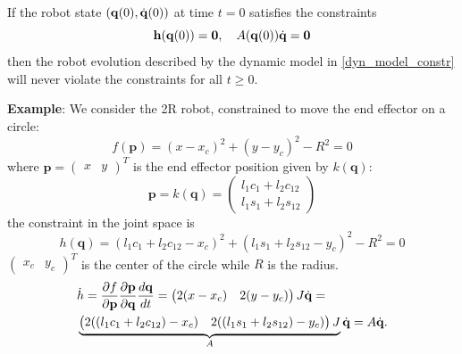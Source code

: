 \documentclass[10pt, a4paper]{report}
\newcommand{\q}{{\mathbf q}}
\begin{document}
\begin{boxproposition}{}{}
    If the robot state $(\q(0),\dq(0))$ at time $t=0$ satisfies the constraints\begin{equation}
        \mathbf h(\q(0))=\mathbf 0, \ \ \ A(\q(0))\dq=\mathbf 0 
    \end{equation}
    then the robot evolution described by the dynamic model in \eqref{dyn_model_constr} will never violate the constraints for all $t\ge 0$.
\end{boxproposition}
\noindent\textbf{Example}: We consider the 2R robot, constrained to move the end effector on a circle:\begin{equation}
    f(\mathbf p)=(x-x_c)^2+(y-y_c)^2-R^2=0 
\end{equation}
where $\mathbf p=\begin{pmatrix}
    x&y
\end{pmatrix}^T$ is the end effector position given by $k(\q)$:\begin{equation}
    \mathbf p = k(\q)=\begin{pmatrix}
        l_1c_1+l_2c_{12}\\ 
        l_1s_1+l_2s_{12}
    \end{pmatrix}
\end{equation}
the constraint in the joint space is\begin{equation}
    h(\q)=( l_1c_1+l_2c_{12}-x_c)^2+(l_1s_1+l_2s_{12}-y_c)^2-R^2=0 
\end{equation}
$\begin{pmatrix}
    x_c&y_c
\end{pmatrix}^T$ is the center of the circle while $R$ is the radius.\begin{align}
    &\dot h = \frac{\partial f}{\partial {\mathbf p}}\frac{\partial  {\mathbf p}}{\partial \q}\frac{d \q}{dt}=\begin{pmatrix}
        2(x-x_c)&2(y-y_c)
    \end{pmatrix}J\dq=\\
    &\underbrace{\begin{pmatrix}
        2(( l_1c_1+l_2c_{12})-x_c)&2(( l_1s_1+l_2s_{12})-y_c)
    \end{pmatrix}J}_{A}\dq=A\dq.
\end{align}
\end{document}
